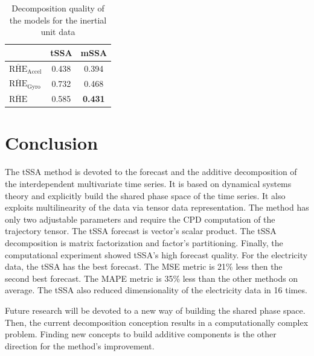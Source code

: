 \documentclass[referee, pdflatex, sn-mathphys-num]{sn-jnl}
\theoremstyle{definition}
\theoremstyle{plain}
\begin{document}
	\def\arraystretch{1.2}
	\begin{table}[h!]
		\centering
		\caption{Decomposition quality of the models for the inertial unit data}\label{tab:decomp_motion_results}
		\begin{tabular}{|l|c|c|}
			\hline
			\diagbox{Metric}{Method} & tSSA  & mSSA           \\ \hline
			$ \overline{\text{RHE}}_{\text{Accel}} $   & 0.438 & 0.394          \\ \hline
			$ \overline{\text{RHE}}_{\text{Gyro}} $ & 0.732 & 0.468          \\ \hline
			$ \overline{\text{RHE}} $         & 0.585 & \textbf{0.431} \\ \hline
		\end{tabular}
	\end{table}	
	
	\section{Conclusion}
	
		The tSSA method is devoted to the forecast and the additive decomposition of the interdependent multivariate time series. It is based on dynamical systems theory and explicitly build the shared phase space of the time series. It also exploits multilinearity of the data via tensor data representation. The method has only two adjustable parameters and require the CPD computation of the trajectory tensor. The tSSA forecast is vector's scalar product. The tSSA decomposition is matrix factorization and factor's partitioning. Finally, the computational experiment showed tSSA's high forecast quality. For the electricity data, the tSSA has the best forecast. The MSE metric is 21\% less then the second best forecast. The MAPE metric is 35\% less than the other methods on average. The tSSA also reduced dimensionality of the electricity data in 16 times.
		
		Future research will be devoted to a new way of building the shared phase space. Then, the current decomposition conception results in a computationally complex problem. Finding new concepts to build additive components is the other direction for the method's improvement.
		
		
	
 
\end{document}
